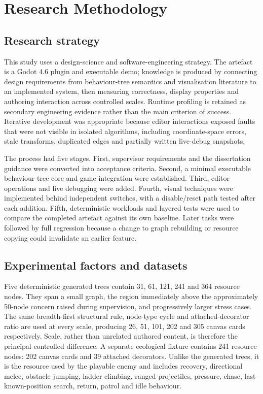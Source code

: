 \chapter{Research Methodology}
\label{ch:methodology}

\section{Research strategy}

This study uses a design-science and software-engineering strategy. The artefact is a Godot 4.6 plugin and executable demo; knowledge is produced by connecting design requirements from behaviour-tree semantics and visualisation literature to an implemented system, then measuring correctness, display properties and authoring interaction across controlled scales. Runtime profiling is retained as secondary engineering evidence rather than the main criterion of success. Iterative development was appropriate because editor interactions exposed faults that were not visible in isolated algorithms, including coordinate-space errors, stale transforms, duplicated edges and partially written live-debug snapshots.

The process had five stages. First, supervisor requirements and the dissertation guidance were converted into acceptance criteria. Second, a minimal executable behaviour-tree core and game integration were established. Third, editor operations and live debugging were added. Fourth, visual techniques were implemented behind independent switches, with a disable/reset path tested after each addition. Fifth, deterministic workloads and layered tests were used to compare the completed artefact against its own baseline. Later tasks were followed by full regression because a change to graph rebuilding or resource copying could invalidate an earlier feature.

\section{Experimental factors and datasets}

Five deterministic generated trees contain 31, 61, 121, 241 and 364 resource nodes. They span a small graph, the region immediately above the approximately 50-node concern raised during supervision, and progressively larger stress cases. The same breadth-first structural rule, node-type cycle and attached-decorator ratio are used at every scale, producing 26, 51, 101, 202 and 305 canvas cards respectively. Scale, rather than unrelated authored content, is therefore the principal controlled difference. A separate ecological fixture contains 241 resource nodes: 202 canvas cards and 39 attached decorators. Unlike the generated trees, it is the resource used by the playable enemy and includes recovery, directional melee, obstacle jumping, ladder climbing, ranged projectiles, pressure, chase, last-known-position search, return, patrol and idle behaviour.

